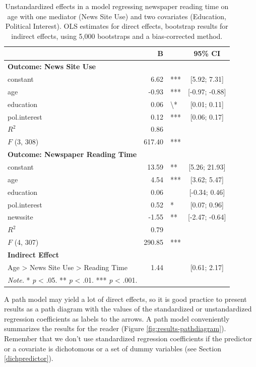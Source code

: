 \documentclass[a4paper]{book}
\theoremstyle{definition}
\theoremstyle{definition}
\theoremstyle{definition}
\theoremstyle{remark}
\begin{document}
\begin{table}

\caption{\label{tab:mediation-table}Unstandardized effects in a model regressing newspaper reading time on age with one mediator (News Site Use) and two covariates (Education, Political Interest). OLS estimates for direct effects, bootstrap results for indirect effects, using 5,000 bootstraps and a bias-corrected method.}
\centering
\fontsize{8}{8}\selectfont
\begin{tabular}[t]{lrlc}
\hline
 & B &  & 95\% CI\\
\hline
\textbf{Outcome: News Site Use} &  &  & \\
constant & 6.62 & *** & [5.92; 7.31]\\
age & -0.93 & *** & [-0.97; -0.88]\\
education & 0.06 & \textbackslash{}* & [0.01; 0.11]\\
pol.interest & 0.12 & *** & [0.06; 0.17]\\
$R^{2}$ & 0.86 &  & \\
$F$ (3, 308) & 617.40 & *** & \\
\hline
\textbf{Outcome: Newspaper Reading Time} &  &  & \\
constant & 13.59 & ** & [5.26; 21.93]\\
age & 4.54 & *** & [3.62; 5.47]\\
education & 0.06 &  & [-0.34; 0.46]\\
pol.interest & 0.52 & * & [0.07; 0.96]\\
newssite & -1.55 & ** & [-2.47; -0.64]\\
$R^{2}$ & 0.79 &  & \\
$F$ (4, 307) & 290.85 & *** & \\
\hline
\textbf{Indirect Effect} &  &  & \\
Age > News Site Use > Reading Time & 1.44 &  & [0.61; 2.17]\\
\hline
\multicolumn{4}{l}{\textit{Note.} * \textit{p} < .05. ** \textit{p} < .01. *** \textit{p} < .001.}\\
\end{tabular}
\end{table}

A path model may yield a lot of direct effects, so it is good practice
to present results as a path diagram with the values of the standardized
or unstandardized regression coefficients as labels to the arrows. A
path model conveniently summarizes the results for the reader (Figure
\ref{fig:results-pathdiagram}). Remember that we don't use standardized
regression coefficients if the predictor or a covariate is dichotomous
or a set of dummy variables (see Section \ref{dichpredictor}).
\end{document}
